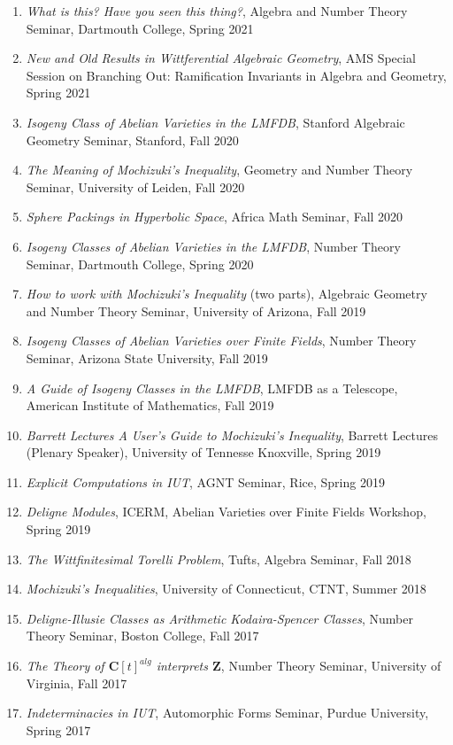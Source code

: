 \documentclass[a4paper,10pt]{article}
\newcommand{\CC}{\mathbf{C}}
\newcommand{\ZZ}{\mathbf{Z}}
\begin{document}
\begin{enumerate}
	\item \emph{What is this? Have you seen this thing?}, Algebra and Number Theory Seminar, Dartmouth College, Spring 2021
	\item \emph{New and Old Results in Wittferential Algebraic Geometry}, AMS Special Session on Branching Out: Ramification Invariants in Algebra and Geometry, Spring 2021
	\item \emph{Isogeny Class of Abelian Varieties in the LMFDB}, Stanford Algebraic Geometry Seminar, Stanford, Fall 2020
	\item \emph{The Meaning of Mochizuki’s Inequality}, Geometry and Number Theory Seminar, University of Leiden, Fall 2020
	\item \emph{Sphere Packings in Hyperbolic Space}, Africa Math Seminar, Fall 2020
	\item \emph{Isogeny Classes of Abelian Varieties in the LMFDB}, Number Theory Seminar, Dartmouth College, Spring 2020
	\item \emph{How to work with Mochizuki's Inequality} (two parts), Algebraic Geometry and Number Theory Seminar, University of Arizona, Fall 2019
	\item \emph{Isogeny Classes of Abelian Varieties over Finite Fields}, Number Theory Seminar, Arizona State University, Fall 2019
	\item \emph{A Guide of Isogeny Classes in the LMFDB}, LMFDB as a Telescope, American Institute of Mathematics, Fall 2019
	\item \emph{Barrett Lectures	A User's Guide to Mochizuki's Inequality}, Barrett Lectures (Plenary Speaker), University of Tennesse Knoxville, Spring 2019
	\item \emph{Explicit Computations in IUT}, AGNT Seminar, Rice, Spring 2019
	\item \emph{Deligne Modules}, ICERM, Abelian Varieties over Finite Fields Workshop, Spring 2019
	\item \emph{The Wittfinitesimal Torelli Problem}, Tufts, Algebra Seminar, Fall 2018
	\item \emph{Mochizuki's Inequalities}, University of Connecticut, CTNT, Summer 2018
	\item \emph{Deligne-Illusie Classes as Arithmetic Kodaira-Spencer Classes}, Number Theory Seminar, Boston College, Fall 2017
	\item \emph{The Theory of $\CC[t]^{alg}$ interprets $\ZZ$}, Number Theory Seminar, University of Virginia, Fall 2017
	\item \emph{Indeterminacies in IUT}, Automorphic Forms Seminar, Purdue University, Spring 2017

\end{enumerate}
\end{document}
